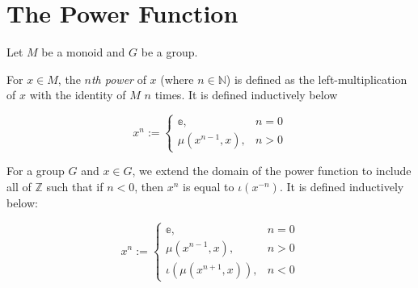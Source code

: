 \section{The Power Function}

Let $M$ be a monoid and $G$ be a group.

\begin{definition}
    \label{definition : mpow}
    \leanok
    For $x \in M$, the \textit{$n$th power} of $x$ (where $n \in \mathbb{N}$) is defined as the left-multiplication of $x$ with the identity of $M$ $n$ times. It is defined inductively below

    \begin{equation*}
        x^n := \begin{cases}
            \mathbb{e}, & n = 0 \\
            \mu(x^{n-1}, x), & n \gt 0
        \end{cases}
    \end{equation*}
\end{definition}

\begin{definition}
    \label{definition : gpow}
    \leanok
    For a group $G$ and $x \in G$, we extend the domain of the power function to include all of $\mathbb{Z}$ such that if $n \lt 0$, then $x^n$ is equal to $\iota(x^{-n})$. It is defined inductively below:

    \begin{equation*}
        x^n := \begin{cases}
            \mathbb{e}, & n = 0 \\
            \mu(x^{n-1}, x), & n \gt 0 \\
            \iota(\mu(x^{n+1}, x)), & n \lt 0
        \end{cases}
    \end{equation*}
\end{definition}
